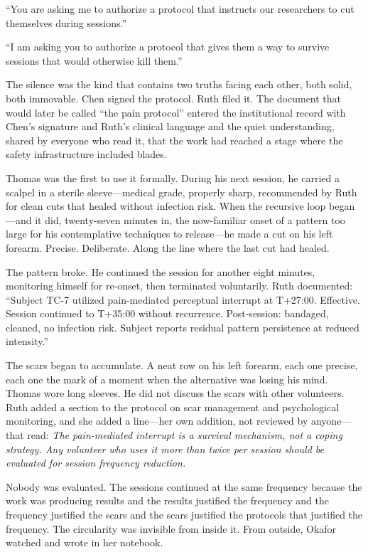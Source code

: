 ``You are asking me to authorize a protocol that instructs our researchers to cut themselves during sessions.''

``I am asking you to authorize a protocol that gives them a way to survive sessions that would otherwise kill them.''

The silence was the kind that contains two truths facing each other, both solid, both immovable. Chen signed the protocol. Ruth filed it. The document that would later be called ``the pain protocol'' entered the institutional record with Chen's signature and Ruth's clinical language and the quiet understanding, shared by everyone who read it, that the work had reached a stage where the safety infrastructure included blades.

Thomas was the first to use it formally. During his next session, he carried a scalpel in a sterile sleeve---medical grade, properly sharp, recommended by Ruth for clean cuts that healed without infection risk. When the recursive loop began---and it did, twenty-seven minutes in, the now-familiar onset of a pattern too large for his contemplative techniques to release---he made a cut on his left forearm. Precise. Deliberate. Along the line where the last cut had healed.

The pattern broke. He continued the session for another eight minutes, monitoring himself for re-onset, then terminated voluntarily. Ruth documented: ``Subject TC-7 utilized pain-mediated perceptual interrupt at T+27:00. Effective. Session continued to T+35:00 without recurrence. Post-session: bandaged, cleaned, no infection risk. Subject reports residual pattern persistence at reduced intensity.''

The scars began to accumulate. A neat row on his left forearm, each one precise, each one the mark of a moment when the alternative was losing his mind. Thomas wore long sleeves. He did not discuss the scars with other volunteers. Ruth added a section to the protocol on scar management and psychological monitoring, and she added a line---her own addition, not reviewed by anyone---that read: \textit{The pain-mediated interrupt is a survival mechanism, not a coping strategy. Any volunteer who uses it more than twice per session should be evaluated for session frequency reduction.}

Nobody was evaluated. The sessions continued at the same frequency because the work was producing results and the results justified the frequency and the frequency justified the scars and the scars justified the protocols that justified the frequency. The circularity was invisible from inside it. From outside, Okafor watched and wrote in her notebook.

